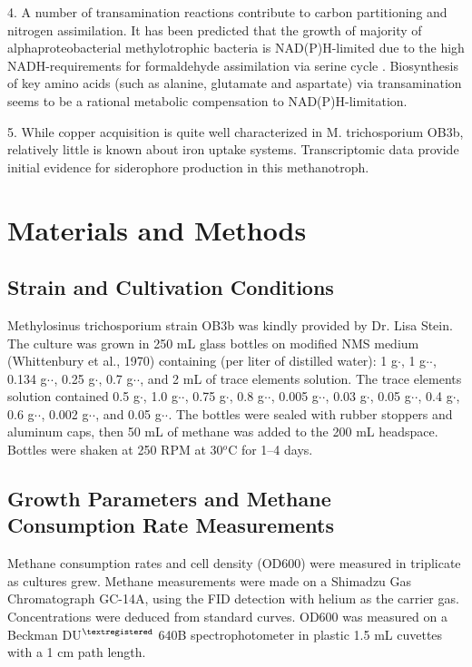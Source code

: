 4. A number of transamination reactions contribute to carbon partitioning and nitrogen assimilation.
It has been predicted that the growth of majority of alphaproteobacterial methylotrophic bacteria is NAD(P)H-limited due to the high NADH-requirements for formaldehyde assimilation via serine cycle \cite{anthony1978}.
Biosynthesis of key amino acids (such as alanine, glutamate and aspartate) via transamination seems to be a rational metabolic compensation to NAD(P)H-limitation.

5. While copper acquisition is quite well characterized in M. trichosporium OB3b, relatively little is known about iron uptake systems.
Transcriptomic data provide initial evidence for siderophore production in this methanotroph.

\section{Materials and Methods}
\subsection{Strain and Cultivation Conditions}
Methylosinus trichosporium strain OB3b was kindly provided by Dr. Lisa Stein.
The culture was grown in 250 mL glass bottles on modified NMS medium (Whittenbury et al., 1970) containing (per liter of distilled water): 1 g$\cdot$, 1 g$\cdot$$\cdot$, 0.134 g$\cdot$$\cdot$, 0.25 g$\cdot$, 0.7 g$\cdot$$\cdot$, and 2 mL of trace elements solution.
The trace elements solution contained 0.5 g$\cdot$, 1.0 g$\cdot$$\cdot$, 0.75 g$\cdot$, 0.8 g$\cdot$$\cdot$, 0.005 g$\cdot$$\cdot$, 0.03 g$\cdot$, 0.05 g$\cdot$$\cdot$, 0.4 g$\cdot$, 0.6 g$\cdot$$\cdot$, 0.002 g$\cdot$$\cdot$, and 0.05 g$\cdot$$\cdot$.
The bottles were sealed with rubber stoppers and aluminum caps, then 50 mL of methane was added to the 200 mL headspace.
Bottles were shaken at 250 RPM at 30$^o$C for 1–4 days.

\subsection{Growth Parameters and Methane Consumption Rate Measurements}
Methane consumption rates and cell density (OD600) were measured in triplicate as cultures grew.
Methane measurements were made on a Shimadzu Gas Chromatograph GC-14A, using the FID detection with helium as the carrier gas.
Concentrations were deduced from standard curves.
OD600 was measured on a Beckman DU$^{\textregistered}$ 640B spectrophotometer in plastic 1.5 mL cuvettes with a 1 cm path length.

